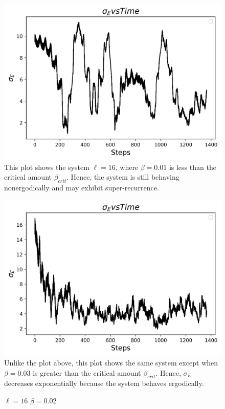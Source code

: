 \documentclass[twocolumn]{article}
\begin{document}
\begin{figure}[ht!]
\centering
\caption{$\ell=16$ $\beta=0.01$}
\includegraphics[scale=.55]{sigmaMode=16B=001}
\small{This plot shows the system $\ell=16$, where $\beta=0.01$ is less than the critical amount $\beta_{crit}$. Hence, the system is still behaving nonergodically and may exhibit super-recurrence.}
\centering
\caption{$\ell=16$ $\beta=0.02$}
\includegraphics[scale=.55]{sigmaMode=16B=003}
\small{Unlike the plot above, this plot shows the same system except when $\beta=0.03$ is greater than the critical amount $\beta_{crit}$. Hence, $\sigma_E$ decreases exponentially because the system behaves ergodically.}
\end{figure}
\end{document}
